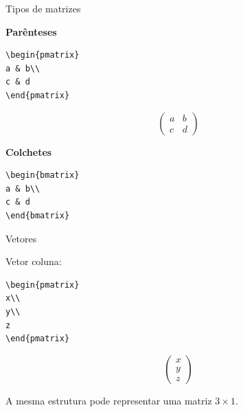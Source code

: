 \documentclass[aspectratio=169,xcolor=dvipsnames]{beamer}
\begin{document}
\begin{frame}[fragile]{Tipos de matrizes}

    \textbf{Parênteses}

\begin{lstlisting}
\begin{pmatrix}
a & b\\
c & d
\end{pmatrix}
\end{lstlisting}

    \[
        \begin{pmatrix}
            a & b\\
            c & d
        \end{pmatrix}
    \]

    \textbf{Colchetes}

\begin{lstlisting}
\begin{bmatrix}
a & b\\
c & d
\end{bmatrix}
\end{lstlisting}

\end{frame}

\begin{frame}[fragile]{Vetores}

    Vetor coluna:

\begin{lstlisting}
\begin{pmatrix}
x\\
y\\
z
\end{pmatrix}
\end{lstlisting}

    \[
        \begin{pmatrix}
            x\\
            y\\
            z
        \end{pmatrix}
    \]

    \vspace{0.2cm}

    A mesma estrutura pode representar uma matriz $3\times1$.

\end{frame}
\end{document}
